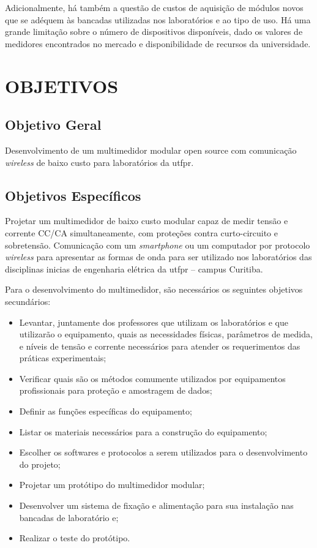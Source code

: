 Adicionalmente, há também a questão de custos de aquisição de módulos novos que se adéquem às bancadas utilizadas nos laboratórios e ao tipo de uso. Há uma grande limitação sobre o número de dispositivos disponíveis, dado os valores de medidores encontrados no mercado e disponibilidade de recursos da universidade.

\section{OBJETIVOS}\label{sec:objetivos}

\subsection{Objetivo Geral}\label{sec:objgeral}
Desenvolvimento de um multimedidor modular open source com comunicação \textit{wireless} de baixo custo para laboratórios da \gls{utfpr}.


\subsection{Objetivos Específicos}\label{sec:objespec}
Projetar um multimedidor de baixo custo modular capaz de medir tensão e corrente \gls{CC}/\gls{CA} simultaneamente, com proteções contra curto-circuito e sobretensão. Comunicação com um \textit{smartphone} ou um computador por protocolo \textit{wireless} para apresentar as formas de onda para ser utilizado nos laboratórios das disciplinas inicias de engenharia elétrica da \gls{utfpr} – campus Curitiba.

Para o desenvolvimento do multimedidor, são necessários os seguintes objetivos secundários:

\begin{itemize}
    \item Levantar, juntamente dos professores que utilizam os laboratórios e que utilizarão o equipamento, quais as necessidades físicas, parâmetros de medida, e níveis de tensão e corrente necessários para atender os requerimentos das práticas experimentais;
    \item Verificar quais são os métodos comumente utilizados por equipamentos profissionais para proteção e amostragem de dados;
    \item Definir as funções específicas do equipamento;
    \item Listar os materiais necessários para a construção do equipamento;
    \item Escolher os softwares e protocolos a serem utilizados para o desenvolvimento do projeto;
    \item Projetar um protótipo do multimedidor modular;
    \item Desenvolver um sistema de fixação e alimentação para sua instalação nas bancadas de laboratório e;
    \item Realizar o teste do protótipo.
\end{itemize}

